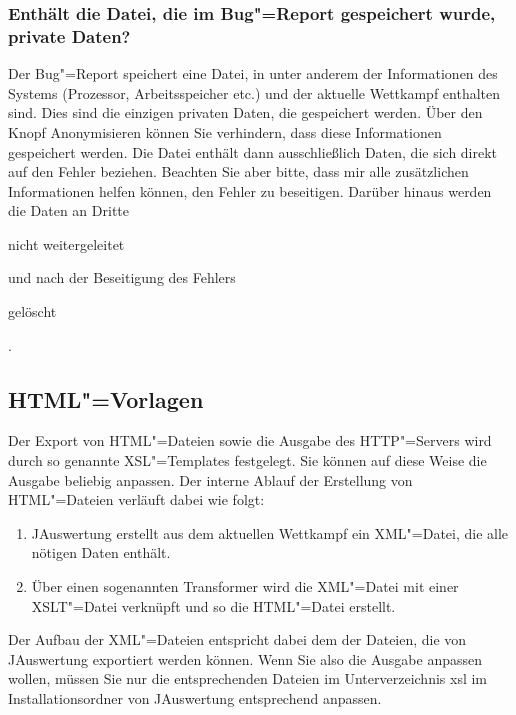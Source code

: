 \documentclass[11pt,a4paper,twoside,ngerman]{article}
\begin{document}
\subsubsection*{Enthält die Datei, die im \glqq{}Bug"=Report\grqq{} gespeichert wurde, private Daten?}
Der Bug"=Report speichert eine Datei, in unter anderem der Informationen des Systems (Prozessor, Arbeitsspeicher etc.) und der aktuelle Wettkampf enthalten sind. Dies sind die einzigen privaten Daten, die gespeichert werden. Über den Knopf \glqq{}Anonymisieren\grqq{} können Sie verhindern, dass diese Informationen gespeichert werden. Die Datei enthält dann ausschließlich Daten, die sich direkt auf den Fehler beziehen. Beachten Sie aber bitte, dass mir alle zusätzlichen Informationen helfen können, den Fehler zu beseitigen. Darüber hinaus werden die Daten an Dritte \begin{bfseries}nicht weitergeleitet\end{bfseries} und nach der Beseitigung des Fehlers \begin{bfseries}gelöscht\end{bfseries}.


\newpage

\subsection{HTML"=Vorlagen}
\label{lbl:xslt::begin}
Der Export von HTML"=Dateien sowie die Ausgabe des HTTP"=Servers wird durch so genannte XSL"=Templates festgelegt. Sie können auf diese Weise die Ausgabe beliebig anpassen. Der interne Ablauf der Erstellung von HTML"=Dateien verläuft dabei wie folgt:
\begin{enumerate}

\item JAuswertung erstellt aus dem aktuellen Wettkampf ein XML"=Datei, die alle nötigen Daten enthält.


\item Über einen sogenannten Transformer wird die XML"=Datei mit einer XSLT"=Datei verknüpft und so die HTML"=Datei erstellt.


\end{enumerate}


Der Aufbau der XML"=Dateien entspricht dabei dem der Dateien, die von JAuswertung exportiert werden können. Wenn Sie also die Ausgabe anpassen wollen, müssen Sie nur die entsprechenden Dateien im Unterverzeichnis \glqq{}xsl\grqq{} im Installationsordner von JAuswertung entsprechend anpassen.
\end{document}
